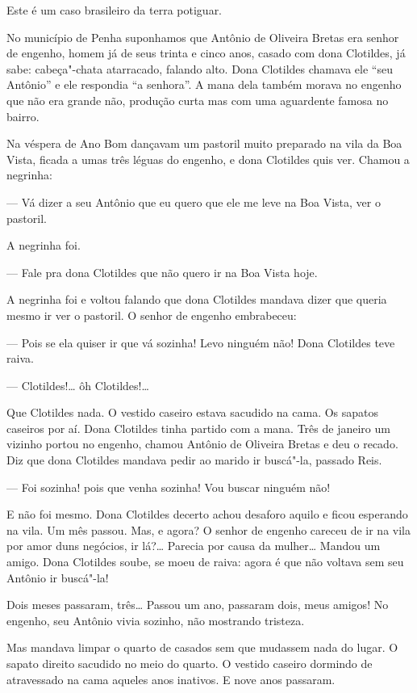 Este é um caso brasileiro da terra potiguar.

No município de Penha suponhamos que Antônio de Oliveira Bretas era
senhor de engenho, homem já de seus trinta e cinco anos, casado com dona
Clotildes, já sabe: cabeça"-chata atarracado, falando alto. Dona
Clotildes chamava ele ``seu Antônio'' e ele respondia ``a senhora''. A mana
dela também morava no engenho que não era grande não, produção curta mas
com uma aguardente famosa no bairro.

Na véspera de Ano Bom dançavam um pastoril muito preparado na vila da
Boa Vista, ficada a umas três léguas do engenho, e dona Clotildes quis
ver. Chamou a negrinha:

--- Vá dizer a seu Antônio que eu quero que ele me leve na Boa Vista,
ver o pastoril.

A negrinha foi.

--- Fale pra dona Clotildes que não quero ir na Boa Vista hoje.

A negrinha foi e voltou falando que dona Clotildes mandava dizer que
queria mesmo ir ver o pastoril. O senhor de engenho embrabeceu:

--- Pois se ela quiser ir que vá sozinha! Levo ninguém não! Dona
Clotildes teve raiva.

--- Clotildes!\ldots{} ôh Clotildes!\ldots{}

Que Clotildes nada. O vestido caseiro estava sacudido na cama. Os
sapatos caseiros por aí. Dona Clotildes tinha partido com a mana. Três
de janeiro um vizinho portou no engenho, chamou Antônio de Oliveira
Bretas e deu o recado. Diz que dona Clotildes mandava pedir ao marido ir
buscá"-la, passado Reis.

--- Foi sozinha! pois que venha sozinha! Vou buscar ninguém não!

E não foi mesmo. Dona Clotildes decerto achou desaforo aquilo e ficou
esperando na vila. Um mês passou. Mas, e agora? O senhor de engenho
careceu de ir na vila por amor duns negócios, ir lá?\ldots{} Parecia por
causa da mulher\ldots{} Mandou um amigo. Dona Clotildes soube, se moeu de
raiva: agora é que não voltava sem seu Antônio ir buscá"-la!

Dois meses passaram, três\ldots{} Passou um ano, passaram dois, meus amigos!
No engenho, seu Antônio vivia sozinho, não mostrando tristeza.

Mas mandava limpar o quarto de casados sem que mudassem nada do lugar. O
sapato direito sacudido no meio do quarto. O vestido caseiro dormindo de
atravessado na cama aqueles anos inativos. E nove anos passaram.

